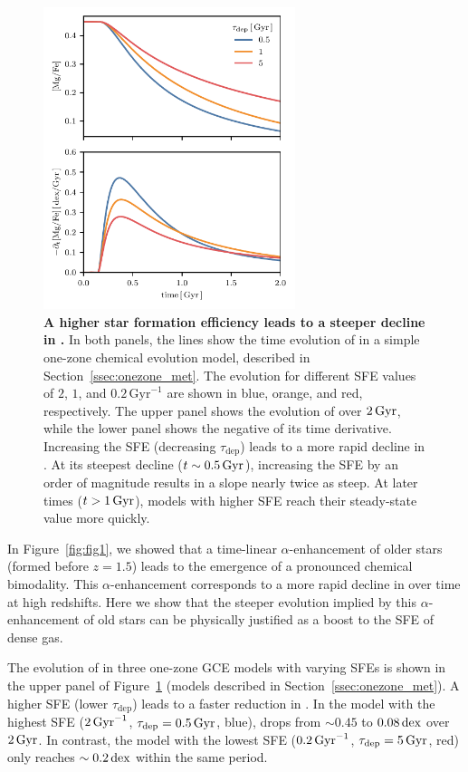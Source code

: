 \begin{figure}
  \centering
  \includegraphics[width=208.14452628pt]{ch4/mgfe_vice.pdf}
  \caption{\textbf{A higher star formation efficiency leads to a steeper decline in \MgFe{}.} In both panels, the lines show the time evolution of \MgFe{} in a simple one-zone chemical evolution model, described in Section~\ref{ssec:onezone_met}. The evolution for different SFE values of $2$, $1$, and $0.2\,\textrm{Gyr}^{-1}$ are shown in blue, orange, and red, respectively.  The upper panel shows the evolution of \MgFe{} over $2\,\textrm{Gyr}$, while the lower panel shows the negative of its time derivative. Increasing the SFE (decreasing $\tau_{\textrm{dep}}$) leads to a more rapid decline in \MgFe{}. At its steepest decline ($t\sim0.5\,\textrm{Gyr}$), increasing the SFE by an order of magnitude results in a slope nearly twice as steep. At later times ($t > 1\,\textrm{Gyr}$), models with higher SFE reach their steady-state \MgFe{} value more quickly.}
  \label{fig:vice}
\end{figure}

In Figure~\ref{fig:fig1}, we showed that a time-linear $\alpha$-enhancement of older stars (formed before $z=1.5$) leads to the emergence of a pronounced chemical bimodality. This $\alpha$-enhancement corresponds to a more rapid decline in \alphaFe{} over time at high redshifts. Here we show that the steeper \alphaFe{} evolution implied by this $\alpha$-enhancement of old stars can be physically justified as a boost to the SFE of dense gas.

The evolution of \MgFe{} in three one-zone GCE models with varying SFEs is shown in the upper panel of Figure~\ref{fig:vice} (models described in Section~\ref{ssec:onezone_met}). A higher SFE (lower $\tau_{\textrm{dep}}$) leads to a faster reduction in \MgFe{}. In the model with the highest SFE ($2\,\textrm{Gyr}^{-1}$, $\tau_{\textrm{dep}}=0.5\,\textrm{Gyr}$, blue), \MgFe{} drops from $\sim0.45$ to $0.08\,\textrm{dex}$ over $2\,\textrm{Gyr}$. In contrast, the model with the lowest SFE ($0.2\,\textrm{Gyr}^{-1}$, $\tau_{\textrm{dep}}=5\,\textrm{Gyr}$, red) only reaches $\sim0.2\,\textrm{dex}$ within the same period.

